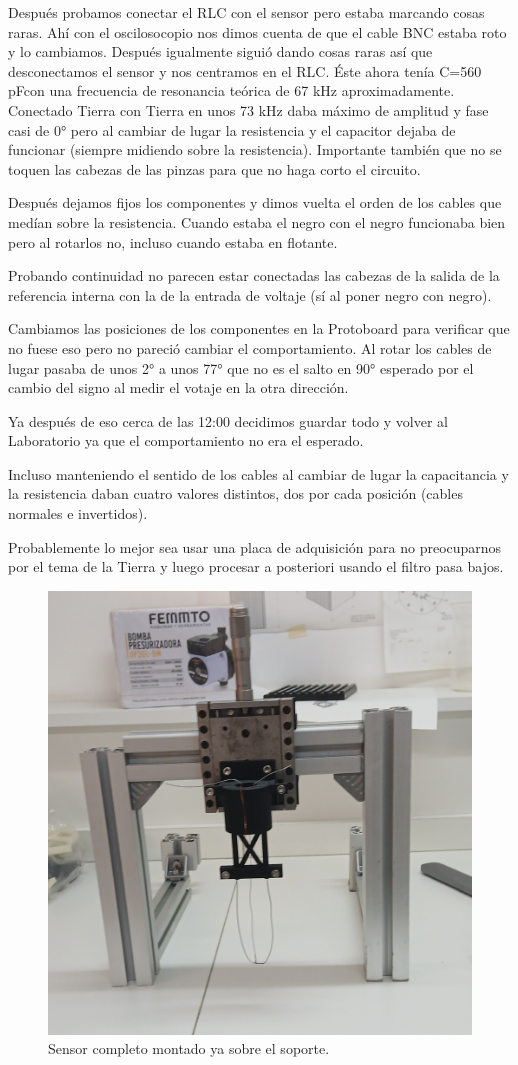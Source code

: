 Después probamos conectar el RLC con el sensor pero estaba marcando cosas raras. Ahí con el oscilosocopio nos dimos cuenta de que el cable BNC estaba roto y lo cambiamos. Después igualmente siguió dando cosas raras así que desconectamos el sensor y nos centramos en el RLC. Éste ahora tenía C=560 pFcon una frecuencia de resonancia teórica de 67 kHz aproximadamente. Conectado Tierra con Tierra en unos 73 kHz daba máximo de amplitud y fase casi de 0° pero al cambiar de lugar la resistencia y el capacitor dejaba de funcionar (siempre midiendo sobre la resistencia).  Importante también que no se toquen las cabezas de las pinzas para que no haga corto el circuito. %

Después dejamos fijos los componentes y dimos vuelta el orden de los cables que medían sobre la resistencia. Cuando estaba el negro con el negro funcionaba bien pero al rotarlos no, incluso cuando estaba en flotante. 

Probando continuidad no parecen estar conectadas las cabezas de la salida de la referencia interna con la de la entrada de voltaje (sí al poner negro con negro). 

Cambiamos las posiciones de los componentes en la Protoboard para verificar que no fuese eso pero no pareció cambiar el comportamiento. Al rotar los cables de lugar pasaba de unos 2° a unos 77° que no es el salto en 90° esperado por el cambio del signo al medir el votaje en la otra dirección. %

Ya después de eso cerca de las 12:00 decidimos guardar todo y volver al Laboratorio ya que el comportamiento no era el esperado. 

Incluso manteniendo el sentido de los cables al cambiar de lugar la capacitancia y la resistencia daban cuatro valores distintos, dos por cada posición (cables normales e invertidos). 

Probablemente lo mejor sea usar una placa de adquisición para no preocuparnos por el tema de la Tierra y luego procesar a posteriori usando el filtro pasa bajos. 

\begin{figure}[!ht]
	\centering 
	\includegraphics[width=0.7\linewidth]{Figures/12_05_2025/20250512_140434.JPG}
	\caption{Sensor completo montado ya sobre el soporte.}
	\label{fig:foto_sensor_completo_12_05_2025}
\end{figure}

